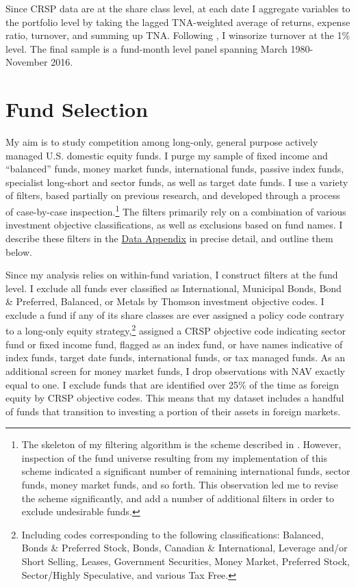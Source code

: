 \documentclass[openany]{book}
\let\rmarkdownfootnote\footnote%
\def\footnote{\protect\rmarkdownfootnote}
\theoremstyle{definition}
\theoremstyle{definition}
\theoremstyle{definition}
\theoremstyle{remark}
\begin{document}
Since CRSP data are at the share class level, at each date I aggregate
variables to the portfolio level by taking the lagged TNA-weighted
average of returns, expense ratio, turnover, and summing up TNA.
Following \citet{pst17}, I winsorize turnover at the 1\% level. The
final sample is a fund-month level panel spanning March 1980-November
2016.

\section{Fund Selection}\label{fund-selection}

My aim is to study competition among long-only, general purpose actively
managed U.S. domestic equity funds. I purge my sample of fixed income
and ``balanced'' funds, money market funds, international funds, passive
index funds, specialist long-short and sector funds, as well as target
date funds. I use a variety of filters, based partially on previous
research, and developed through a process of case-by-case
inspection.\footnote{The skeleton of my filtering algorithm is the
  scheme described in \citet{ksz08}. However, inspection of the fund
  universe resulting from my implementation of this scheme indicated a
  significant number of remaining international funds, sector funds,
  money market funds, and so forth. This observation led me to revise
  the scheme significantly, and add a number of additional filters in
  order to exclude undesirable funds.} The filters primarily rely on a
combination of various investment objective classifications, as well as
exclusions based on fund names. I describe these filters in the
\href{https://www.dropbox.com/s/qugvhb8b0wqp0cg/LJ_JMP_Data_Appendix.pdf?dl=0}{Data
Appendix} in precise detail, and outline them below.

Since my analysis relies on within-fund variation, I construct filters
at the fund level. I exclude all funds ever classified as International,
Municipal Bonds, Bond \& Preferred, Balanced, or Metals by Thomson
investment objective codes. I exclude a fund if any of its share classes
are ever assigned a policy code contrary to a long-only equity
strategy,\footnote{Including codes corresponding to the following
  classifications: Balanced, Bonds \& Preferred Stock, Bonds, Canadian
  \& International, Leverage and/or Short Selling, Leases, Government
  Securities, Money Market, Preferred Stock, Sector/Highly Speculative,
  and various Tax Free.} assigned a CRSP objective code indicating
sector fund or fixed income fund, flagged as an index fund, or have
names indicative of index funds, target date funds, international funds,
or tax managed funds. As an additional screen for money market funds, I
drop observations with NAV exactly equal to one. I exclude funds that
are identified over 25\% of the time as foreign equity by CRSP objective
codes. This means that my dataset includes a handful of funds that
transition to investing a portion of their assets in foreign markets.
\end{document}
